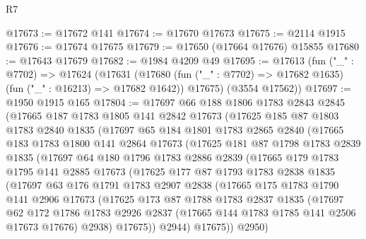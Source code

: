\begin{lexlean}{R7}
\begin{coremodule}
@17673 := @17672 @141
@17674 := @17670 @17673
@17675 := @2114 @1915
@17676 := @17674 @17675
@17679 := @17650 (@17664 @17676) @15855
@17680 := @17643 @17679
@17682 := @1984 @4209 @49
@17695 := @17613
    (fun ("_" : @7702) =>
    @17624
      (@17631
        (@17680 (fun ("_" : @7702) => @17682 @1635) (fun ("_" : @16213) => @17682 @1642))
        @17675)
      (@3554 @17562))
@17697 := @1950 @1915 @165
@17804 := @17697
    @66
    @188
    @1806
    @1783
    @2843
    @2845
    (@17665
      @187
      @1783
      @1805
      @141
      @2842
      @17673
      (@17625
        @185
        @87
        @1803
        @1783
        @2840
        @1835
        (@17697
          @65
          @184
          @1801
          @1783
          @2865
          @2840
          (@17665
            @183
            @1783
            @1800
            @141
            @2864
            @17673
            (@17625
              @181
              @87
              @1798
              @1783
              @2839
              @1835
              (@17697
                @64
                @180
                @1796
                @1783
                @2886
                @2839
                (@17665
                  @179
                  @1783
                  @1795
                  @141
                  @2885
                  @17673
                  (@17625
                    @177
                    @87
                    @1793
                    @1783
                    @2838
                    @1835
                    (@17697
                      @63
                      @176
                      @1791
                      @1783
                      @2907
                      @2838
                      (@17665
                        @175
                        @1783
                        @1790
                        @141
                        @2906
                        @17673
                        (@17625
                          @173
                          @87
                          @1788
                          @1783
                          @2837
                          @1835
                          (@17697
                            @62
                            @172
                            @1786
                            @1783
                            @2926
                            @2837
                            (@17665 @144 @1783 @1785 @141 @2506 @17673 @17676)
                            @2938)
                          @17675))
                      @2944)
                    @17675))
                @2950)

\end{coremodule}
\end{lexlean}
